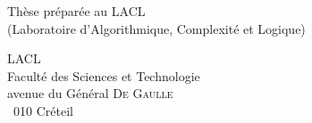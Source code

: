 \cleardoublepage
\mbox{}
\clearpage
\mbox{}
\vfill
\noindent
Thèse préparée au LACL\\
\noindent
(Laboratoire d'Algorithmique, Complexité et Logique)

\bigskip

\noindent
LACL\\
\noindent
Faculté des Sciences et Technologie\\
 avenue du Général {\scshape De Gaulle}\\
 010 Créteil
